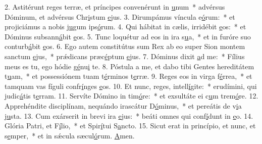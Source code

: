 2. Astitérunt reges terræ, et príncipes convenérunt in \uline{u}num~* advérsus Dóminum, et advérsus Chr\uline{i}stum \uline{e}jus.
3. Dirumpámus víncula e\uline{ó}rum:~* et projiciámus a nobis j\uline{u}gum ips\uline{ó}rum.
4. Qui hábitat in cælis, irridébit \uline{e}os:~* et Dóminus subsann\uline{á}bit \uline{e}os.
5. Tunc loquétur ad eos in ira s\uline{u}a,~* et in furóre suo conturb\uline{á}bit \uline{e}os.
6. Ego autem constitútus sum Rex ab eo super Sion montem sanctum \uline{e}jus,~* prǽdicans præc\uline{é}ptum \uline{e}jus.
7. Dóminus dixit \uline{a}d me:~* Fílius meus es tu, ego hódie g\uline{é}nu\uline{i} te.
8. Póstula a me, et dabo tibi Gentes hereditátem t\uline{u}am,~* et possessiónem tuam t\uline{é}rminos t\uline{e}rræ.
9. Reges eos in virga f\uline{é}rrea,~* et tamquam vas fíguli confr\uline{í}nges \uline{e}os.
10. Et nunc, reges, intell\uline{í}gite:~* erudímini, qui judic\uline{á}tis t\uline{e}rram.
11. Servíte Dómino in tim\uline{ó}re:~* et exsultáte ei c\uline{u}m trem\uline{ó}re.
12. Apprehéndite disciplínam, nequándo irascátur D\uline{ó}minus,~* et pereátis de v\uline{i}a j\uline{u}sta.
13. Cum exárserit in brevi ira \uline{e}jus:~* beáti omnes qui conf\uline{í}dunt in \uline{e}o.
14. Glória Patri, et F\uline{í}lio,~* et Spir\uline{í}tui S\uline{a}ncto.
15. Sicut erat in princípio, et nunc, et s\uline{e}mper,~* et in sǽcula sæcul\uline{ó}rum. \uline{A}men.
